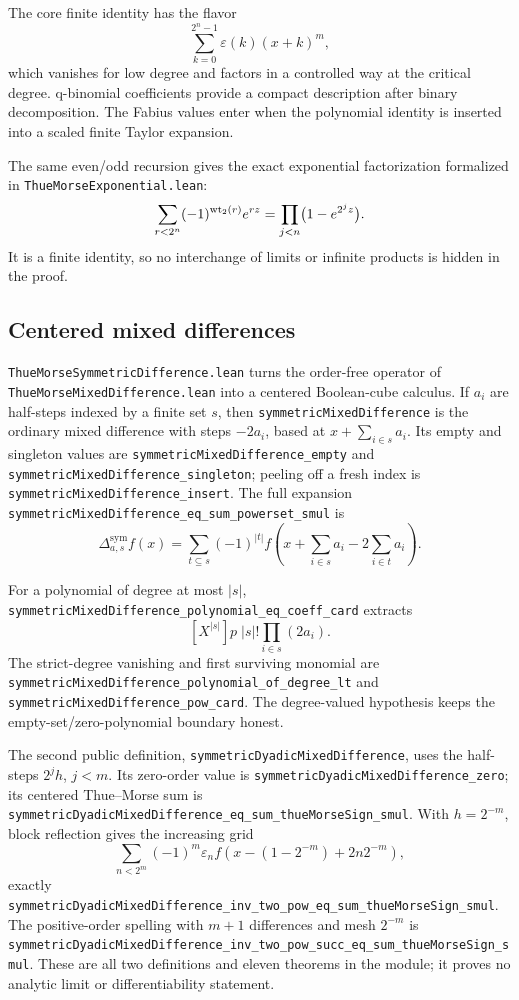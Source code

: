 \documentclass[11pt,oneside]{article}
\theoremstyle{definition}
\theoremstyle{remark}
\begin{document}
The core finite identity has the flavor
\[
  \sum_{k=0}^{2^n-1}\varepsilon(k)(x+k)^m,
\]
which vanishes for low degree and factors in a controlled way at the critical degree.  q-binomial coefficients provide a compact description after binary decomposition.  The Fabius values enter when the polynomial identity is inserted into a scaled finite Taylor expansion.

The same even/odd recursion gives the exact exponential factorization formalized
in \nolinkurl{ThueMorseExponential.lean}:
\[
  \sum_{r<2^n}(-1)^{\operatorname{wt}_{2}(r)}e^{rz}
  =\prod_{j<n}\bigl(1-e^{2^jz}\bigr).
\]
It is a finite identity, so no interchange of limits or infinite products is
hidden in the proof.

\subsection{Centered mixed differences}
\nolinkurl{ThueMorseSymmetricDifference.lean} turns the order-free operator of
\nolinkurl{ThueMorseMixedDifference.lean} into a centered Boolean-cube
calculus.  If \(a_i\) are half-steps indexed by a finite set \(s\), then
\nolinkurl{symmetricMixedDifference} is the ordinary mixed difference with
steps \(-2a_i\), based at \(x+\sum_{i\in s}a_i\).  Its empty and singleton
values are \nolinkurl{symmetricMixedDifference_empty} and
\nolinkurl{symmetricMixedDifference_singleton}; peeling off a fresh index is
\nolinkurl{symmetricMixedDifference_insert}.  The full expansion
\nolinkurl{symmetricMixedDifference_eq_sum_powerset_smul} is
\[
 \Delta^{\mathrm{sym}}_{a,s}f(x)
 =\sum_{t\subseteq s}(-1)^{|t|}
   f\!\left(x+\sum_{i\in s}a_i-2\sum_{i\in t}a_i\right).
\]

For a polynomial of degree at most \(|s|\),
\nolinkurl{symmetricMixedDifference_polynomial_eq_coeff_card} extracts
\[
 [X^{|s|}]p\;|s|!\prod_{i\in s}(2a_i).
\]
The strict-degree vanishing and first surviving monomial are
\nolinkurl{symmetricMixedDifference_polynomial_of_degree_lt} and
\nolinkurl{symmetricMixedDifference_pow_card}.  The degree-valued hypothesis
keeps the empty-set/zero-polynomial boundary honest.

The second public definition, \nolinkurl{symmetricDyadicMixedDifference}, uses
the half-steps \(2^jh\), \(j<m\).  Its zero-order value is
\nolinkurl{symmetricDyadicMixedDifference_zero}; its centered Thue--Morse sum is
\nolinkurl{symmetricDyadicMixedDifference_eq_sum_thueMorseSign_smul}.  With
\(h=2^{-m}\), block reflection gives the increasing grid
\[
 \sum_{n<2^m}(-1)^m\varepsilon_n
 f\!\left(x-(1-2^{-m})+2n2^{-m}\right),
\]
exactly
\nolinkurl{symmetricDyadicMixedDifference_inv_two_pow_eq_sum_thueMorseSign_smul}.
The positive-order spelling with \(m+1\) differences and mesh \(2^{-m}\) is
\nolinkurl{symmetricDyadicMixedDifference_inv_two_pow_succ_eq_sum_thueMorseSign_smul}.
These are all two definitions and eleven theorems in the module; it proves no
analytic limit or differentiability statement.
\end{document}
